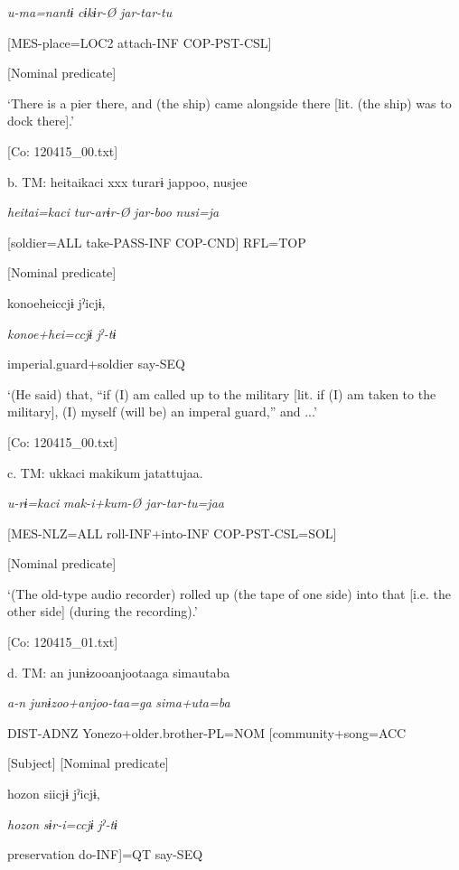       \textit{u-ma=nantɨ}  \textit{cɨkɨr-Ø}  \textit{jar-tar-tu}

      [MES-place=LOC2  attach-INF  COP-PST-CSL]

      [Nominal predicate]

      ‘There is a pier there, and (the ship) came alongside there [lit. (the ship) was to dock there].’

      [Co: 120415\_00.txt]

  b.  TM:  {\textbar}heitai{\textbar}kaci  xxx  turarɨ  jappoo,  nusjee

      \textit{heitai=kaci}    \textit{tur-arɨr-Ø}  \textit{jar-boo}  \textit{nusi=ja}

      [soldier=ALL    take-PASS-INF  COP-CND]  RFL=TOP

      [Nominal predicate]  

      {\textbar}konoehei{\textbar}ccjɨ  jˀicjɨ,  

      \textit{konoe+hei=ccjɨ}  \textit{jˀ-tɨ}  

      imperial.guard+soldier  say-SEQ  

      ‘(He said) that, “if (I) am called up to the military [lit. if (I) am taken to the military], (I) myself (will be) an imperal guard,” and ...’

      [Co: 120415\_00.txt]

  c.  TM:  ukkaci  makikum  jatattujaa.

      \textit{u-rɨ=kaci}  \textit{mak-i+kum{}-Ø  jar-tar-tu=jaa}

      [MES-NLZ=ALL  roll-INF+into-INF  COP-PST-CSL=SOL]

      [Nominal predicate]

      ‘(The old-type audio recorder) rolled up (the tape of one side) into that [i.e. the other side] (during the recording).’

      [Co: 120415\_01.txt]

  d.  TM:  an  junɨzooanjootaaga  simautaba

      \textit{a-n}  \textit{junɨzoo+anjoo-taa=ga}  \textit{sima+uta=ba}

      DIST-ADNZ  Yonezo+older.brother-PL=NOM  [community+song=ACC

      [Subject]  [Nominal predicate]

      {\textbar}hozon{\textbar}  siicjɨ  jˀicjɨ,

      \textit{hozon}  \textit{sɨr-i=ccjɨ}  \textit{jˀ-tɨ}

      preservation  do-INF]=QT  say-SEQ

